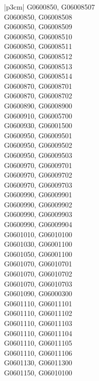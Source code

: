 \begin{customLongTable}{ |p{3cm}| }
G0600850, G06008507 \\ \hline
G0600850, G06008508 \\ \hline
G0600850, G06008509 \\ \hline
G0600850, G06008510 \\ \hline
G0600850, G06008511 \\ \hline
G0600850, G06008512 \\ \hline
G0600850, G06008513 \\ \hline
G0600850, G06008514 \\ \hline
G0600870, G06008701 \\ \hline
G0600870, G06008702 \\ \hline
G0600890, G06008900 \\ \hline
G0600910, G06005700 \\ \hline
G0600930, G06001500 \\ \hline
G0600950, G06009501 \\ \hline
G0600950, G06009502 \\ \hline
G0600950, G06009503 \\ \hline
G0600970, G06009701 \\ \hline
G0600970, G06009702 \\ \hline
G0600970, G06009703 \\ \hline
G0600990, G06009901 \\ \hline
G0600990, G06009902 \\ \hline
G0600990, G06009903 \\ \hline
G0600990, G06009904 \\ \hline
G0601010, G06010100 \\ \hline
G0601030, G06001100 \\ \hline
G0601050, G06001100 \\ \hline
G0601070, G06010701 \\ \hline
G0601070, G06010702 \\ \hline
G0601070, G06010703 \\ \hline
G0601090, G06000300 \\ \hline
G0601110, G06011101 \\ \hline
G0601110, G06011102 \\ \hline
G0601110, G06011103 \\ \hline
G0601110, G06011104 \\ \hline
G0601110, G06011105 \\ \hline
G0601110, G06011106 \\ \hline
G0601130, G06011300 \\ \hline
G0601150, G06010100 \\ \hline

\end{customLongTable}
